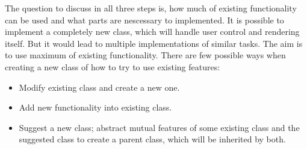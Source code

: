 The question to discuss in all three steps is, how much of existing functionality can be used and what parts are nescessary to implemented. It is possible to implement a completely new class, which will handle user control and rendering itself. But it would lead to multiple implementations of similar tasks. The aim is to use maximum of existing functionality. There are few possible ways when creating a new class of how to try to use existing features:

\begin{itemize}
\item Modify existing class and create a new one.
\item Add new functionality into existing class.
\item Suggest a new class; abstract mutual features of some existing class and the suggested class to create a parent class, which will be inherited by both.
\end{itemize}
